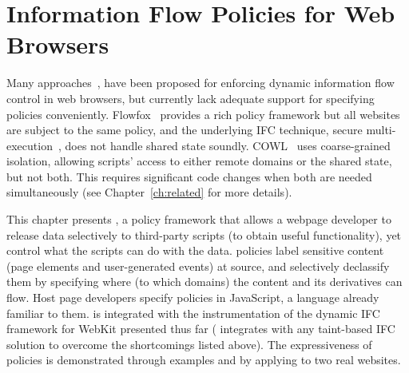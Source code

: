 \chapter{Information Flow Policies for Web Browsers}
\label{ch:webpol}

Many approaches~\cite{jsflow,post14,csf15,chudnov-ccs}, have been
proposed for enforcing dynamic information flow control in web
browsers, but currently lack adequate support for specifying policies
conveniently. Flowfox~\cite{csf14} provides a rich policy framework
but all websites are subject to the same policy, and the underlying IFC
technique, secure multi-execution~\cite{SME}, does not handle shared
state soundly. COWL~\cite{cowl} uses coarse-grained isolation,
allowing scripts' access to either remote domains or the shared state,
but not both. This requires significant code changes when both are
needed simultaneously (see Chapter~\ref{ch:related} for more
details).

This chapter presents {\sys}, a policy framework that allows
a webpage developer to release data selectively to third-party scripts
(to obtain useful functionality), yet control what the scripts can do
with the data. {\sys} policies label
sensitive content (page elements and user-generated events) at source,
and selectively declassify them by specifying where (to which domains)
the content and its derivatives can flow. Host page developers specify
{\sys} policies in JavaScript, a language already familiar to them. 
{\sys} is integrated with the instrumentation of the dynamic IFC
framework for WebKit presented thus far ({\sys} integrates with any
taint-based IFC solution to overcome the shortcomings listed
above). The expressiveness of {\sys} policies is demonstrated through
examples and by applying {\sys} to two real websites. 




